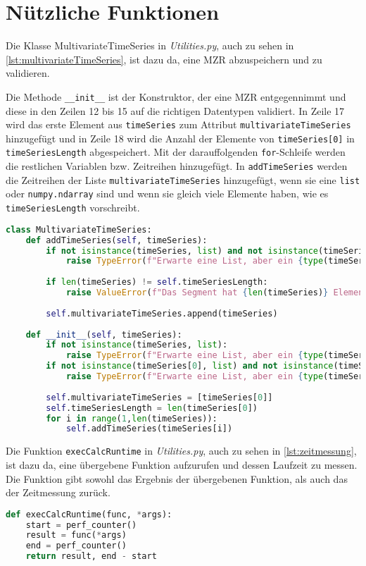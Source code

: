 \section{Nützliche Funktionen}
Die Klasse MultivariateTimeSeries in \textit{Utilities.py}, auch zu sehen in \autoref{lst:multivariateTimeSeries}, ist dazu da, eine \ac{MZR} abzuspeichern und zu validieren.

Die Methode \lstinline{__init__} ist der Konstruktor, der eine \ac{MZR} entgegennimmt und diese in den Zeilen 12 bis 15 auf die richtigen Datentypen validiert. In Zeile 17 wird das erste Element aus \lstinline|timeSeries| zum Attribut \lstinline|multivariateTimeSeries| hinzugefügt und in Zeile 18 wird die Anzahl der Elemente von \lstinline|timeSeries[0]| in \lstinline|timeSeriesLength| abgespeichert. Mit der darauffolgenden \lstinline|for|-Schleife werden die restlichen Variablen bzw. Zeitreihen hinzugefügt. In \lstinline|addTimeSeries| werden die Zeitreihen der Liste \lstinline|multivariateTimeSeries| hinzugefügt, wenn sie eine \lstinline|list| oder \lstinline|numpy.ndarray| sind und wenn sie gleich viele Elemente haben, wie es \lstinline|timeSeriesLength| vorschreibt. 
\begin{lstlisting}[caption=Klasse für \ac{MZR}, language=Python, label=lst:multivariateTimeSeries, style=Python]
class MultivariateTimeSeries:
    def addTimeSeries(self, timeSeries):
        if not isinstance(timeSeries, list) and not isinstance(timeSeries, np.ndarray):
            raise TypeError(f"Erwarte eine List, aber ein {type(timeSeries)} erhalten.")
        
        if len(timeSeries) != self.timeSeriesLength:
            raise ValueError(f"Das Segment hat {len(timeSeries)} Element(e), muss aber {self.timeSeriesLength} haben.")
        
        self.multivariateTimeSeries.append(timeSeries)
    
    def __init__(self, timeSeries):
        if not isinstance(timeSeries, list):
            raise TypeError(f"Erwarte eine List, aber ein {type(timeSeries)} erhalten.")
        if not isinstance(timeSeries[0], list) and not isinstance(timeSeries[0], np.ndarray):
            raise TypeError(f"Erwarte eine List, aber ein {type(timeSeries[0])} erhalten.")
        
        self.multivariateTimeSeries = [timeSeries[0]]
        self.timeSeriesLength = len(timeSeries[0])
        for i in range(1,len(timeSeries)):
            self.addTimeSeries(timeSeries[i])
\end{lstlisting}

Die Funktion \lstinline|execCalcRuntime| in \textit{Utilities.py}, auch zu sehen in \autoref{lst:zeitmessung}, ist dazu da, eine übergebene Funktion aufzurufen und dessen Laufzeit zu messen. Die Funktion gibt sowohl das Ergebnis der übergebenen Funktion, als auch das der Zeitmessung zurück.
\begin{lstlisting}[caption=Funktion zur Zeitmessung, language=Python, label=lst:zeitmessung, style=Python]
def execCalcRuntime(func, *args):
    start = perf_counter()
    result = func(*args)
    end = perf_counter()
    return result, end - start
\end{lstlisting}